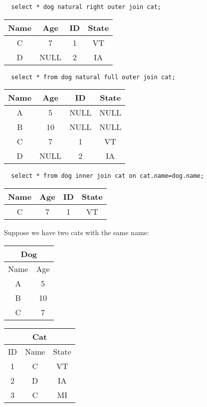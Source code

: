 \documentclass{math}
\begin{document}
\begin{lstlisting}
  select * dog natural right outer join cat;
\end{lstlisting}
\begin{center}
  \begin{tabular}{|c|c|c|c|}
    \hline
    Name & Age & ID & State \\
    \hline
    C & 7 & 1 & VT \\
    D & NULL & 2 & IA \\
    \hline
  \end{tabular}
\end{center}
\begin{lstlisting}
  select * from dog natural full outer join cat;
\end{lstlisting}
\begin{center}
  \begin{tabular}{|c|c|c|c|}
    \hline
    Name & Age & ID & State \\
    \hline
    A & 5 & NULL & NULL \\
    B & 10 & NULL & NULL \\
    C & 7 & 1 & VT \\
    D & NULL & 2 & IA \\
    \hline
  \end{tabular}
\end{center}
\begin{lstlisting}
  select * from dog inner join cat on cat.name=dog.name;
\end{lstlisting}
\begin{center}
  \begin{tabular}{|c|c|c|c|}
    \hline
    Name & Age & ID & State \\
    \hline
    C & 7 & 1 & VT \\
    \hline
  \end{tabular}
\end{center}
Suppose we have two cats with the same name:
\begin{center}
  \begin{tabular}{|c|c|}
    \hline
    \multicolumn{2}{|c|}{Dog} \\
    \hline
    Name & Age \\
    \hline
    A & 5 \\
    B & 10 \\
    C & 7 \\
    \hline
  \end{tabular}
  \begin{tabular}{|c|c|c|}
    \hline
    \multicolumn{3}{|c|}{Cat} \\
    \hline
    ID & Name & State \\
    \hline
    1 & C & VT \\
    2 & D & IA \\
    3 & C & MI \\
    \hline
  \end{tabular}
\end{center}
\end{document}
